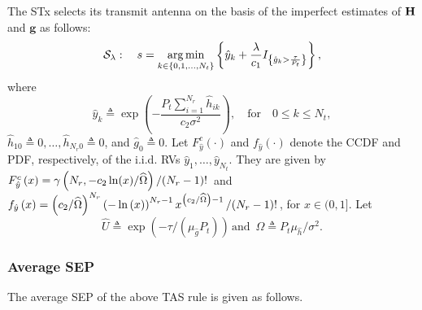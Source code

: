 \documentclass[12pt,draftcls,peerreview,onecolumn]{IEEEtran}
\newcommand{\cbrac}[1]{\left\{{#1}\right\}}
\newcommand{\indic}[1]{I_{\cbrac{#1}}}
\newcommand{\define}{\triangleq}
\newcommand{\mtx}[1]{{\bf #1}} %
\DeclareMathOperator*{\argmin}{arg\,min}
\newcommand{\SEP}{\text{SEP}}
\newcommand{\nx}{{0}}
\newcommand{\lam}{\lambda}
\newcommand{\lamstar}{\lam^{*}}
\newcommand{\Nt}{{N_t}}
\newcommand{\Nr}{{N_r}}
\newcommand{\Pt}{{P_t}}
\newcommand{\such}{h}
\newcommand{\puch}{g}
\newcommand{\g}{\mathbf{\puch}}
\newcommand{\noisevar}{\sigma^2}
\newcommand{\outmax}{O_{\text{max}}}
\newcommand{\itau}{\tau}
\newcommand{\cone}{c_{1}}
\newcommand{\ctwo}{c_{2}}
\newcommand{\out}{O}
\newcommand{\taubypt}{\frac{\itau}{\Pt}}
\newcommand{\gkhatgrtaubypt}[1]{{\gkhat{#1}}>\taubypt}
\newcommand{\ghatindic}[1]{\indic{\gkhatgrtaubypt{#1}}}
\newcommand{\lambym}{\frac{\lam}{\cone}}
\newcommand{\lamstarbym}{\frac{\lamstar}{\cone}}
\newcommand{\ykhatplusgkhat}[1]{ \ykhat{#1} + \lambym\ghatindic{#1}}
\newcommand{\al}{\ctwo}
\newcommand{\snr}{\Omega}
\newcommand{\albysnr}[1][]{\frac{\al#1}{\snr}}
\newcommand{\un}{U}
\newcommand{\allopts}{\left\{\nx,1,\ldots,\Nt\right\}}
\newcommand{\Hmx}{\mtx{H}}
\newcommand{\callamrule}{{\cal S_{{\lam}}}}
\newcommand{\outlam}{\out_{\lam}}
\newcommand{\unhat}{\widehat{\un}}
\newcommand{\snrhat}{\widehat{\snr}}
\newcommand{\hhat}{\hat{\such}}
\newcommand{\ghat}{\hat{\puch}}
\newcommand{\yhat}{\hat{y}}
\newcommand{\hkhat}[1]{\hhat_{#1}}
\newcommand{\gkhat}[1]{\ghat_{#1}}
\newcommand{\ykhat}[1]{\hat{y}_{#1}}
\newcommand{\muhhat}{\mu_{\hhat}}
\newcommand{\mughat}{\mu_{\ghat}}
\newcommand{\ccdfghatinline}{\exp\left( {-{\itau}/{\left( \mughat\Pt\right) }}\right) }
\newcommand{\ccdfyhatrv}[1]{F^{c}_{\yhat}\left(#1 \right) }
\begin{document}
The STx selects its transmit antenna on the basis of the imperfect estimates of $\Hmx$ and $\g$ as follows:  
\begin{equation}
\callamrule:\quad s=\argmin\limits_{k\in\allopts} \left\{ \ykhatplusgkhat{k} \right\},
\label{eq:shat}
\end{equation}
where 
\begin{equation}
\ykhat{k} \define  \exp\left({- \frac{\Pt\sum_{i=1}^{\Nr}\hkhat{ik}}{\ctwo\noisevar} }\right), \quad \text{for} \quad 0\leq k \leq\Nt,
\label{eq:yihat_def}
\end{equation}
$\hkhat{1\nx} \define 0,\ldots,\hkhat{\Nr\nx} \define 0$, and $\gkhat{\nx} \define 0$. Let $F_{\yhat}^{c}(\cdot)$ and $f_{\yhat}(\cdot)$ denote the CCDF and PDF, respectively, of the i.i.d. RVs $\ykhat{1},\dots,\ykhat{\Nt}$. They are given by $F_{\yhat}^{c}\left(x\right) =  {\gamma\left(\Nr,-\ctwo\ln(x)/\snrhat\right)} \left/ {(\Nr-1)!}\right.$ and $f_{\yhat}\left(x\right) = { \left( \ctwo/\snrhat \right)^{\Nr} \left(-\ln\left(x \right)\right)^{\Nr-1} x^{\left( \ctwo/\snrhat \right) - 1}}\left/{(\Nr-1)!}\right.$, for $x \in (0,1]$.  Let 
\begin{equation}
\unhat\define\ccdfghatinline\, \text{and}\,\,\, \snrhat\define{\Pt\muhhat}/{\noisevar}.  
\end{equation}


\newcommand{\D}{\Delta}

\newcommand{\pdfyhatNr}{\left(\ln\left(\frac{1}{x}\right)\right)^{\Nr-1}x^{\albysnr[]-1}} %
\newcommand{\yhattimespdfyNr}{\left[-\ln\left(x\right)\right]^{\Nr-1}x^{\D}} %
\newcommand{\yhatpluslamstartimespdfyNr}{\left[-\ln\left({x+\lamstarbym}\right)\right]^{\Nr-1}\left(x+\lamstarbym\right)^{\D}} %
\newcommand{\yhatpluslamtimespdfyNr}{\left[-\ln\left({x+\lambym}\right)\right]^{\Nr-1}\left(x+\lambym\right)^{\!\!\D}} %
\newcommand{\unccdfyhat}[2]{{#1}\,\,\ccdfyhatrv{#2}}


\newcommand{\avgSEPhat}{\widehat{\SEP}}

\subsubsection{ Average SEP} The average SEP of the above TAS rule is given as follows. 
\end{document}
